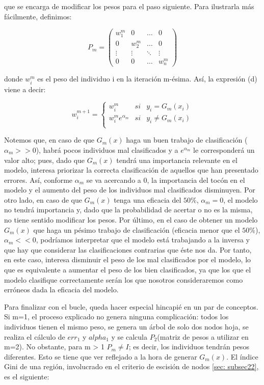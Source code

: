 \documentclass[12pt,twoside]{article}
\begin{document}
\noindent
que se encarga de modificar los pesos para el paso siguiente. Para ilustrarla más fácilmente, definimos:

\begin{equation*}
P_m = 
\begin{pmatrix}
w_1^m & 0 & \dots & 0 \\
0 & w_2^m & \dots & 0 \\
\vdots & \vdots & \ddots & \vdots \\
0 & 0 & \dots & w_n^m
\end{pmatrix}
\end{equation*}

\noindent
donde $w_i^m$ es el peso del individuo i en la iteración m-ésima. Así, la expresión (d) viene a decir:

\begin{equation*}
w_i^{m+1} =
\left\{
\begin{array}{crl}
w_i^m & si & y_i = G_m(x_i) \\
w_i^m e^{\alpha_m} & si & y_i \neq G_m(x_i) \\
\end{array}
\right.
\end{equation*}

Notemos que, en caso de que $G_m(x)$ haga un buen trabajo de clasificación ($\alpha_m >> 0$), habrá pocos individuos mal clasificados y a $e^{\alpha_m}$ le corresponderá un valor alto; pues, dado que $G_m(x)$ tendrá una importancia relevante en el modelo, interesa priorizar la correcta clasificación de aquellos que han presentado errores. Así, conforme $\alpha_m$ se va acercando a 0, la importancia del tocón en el modelo y el aumento del peso de los individuos mal clasificados disminuyen. Por otro lado, en caso de que $G_m(x)$ tenga una eficacia del $50\%$, $\alpha_m = 0$, el modelo no tendrá importancia y, dado que la probabilidad de acertar o no es la misma, no tiene sentido modificar los pesos. Por último, en el caso de obtener un modelo $G_m(x)$ que haga un pésimo trabajo de clasificación (eficacia menor que el $50\%$), $\alpha_m << 0$, podríamos interpretar que el modelo está trabajando a la inversa y que hay que considerar las clasificaciones contrarias que éste nos da. Por tanto, en este caso, interesa disminuir el peso de los mal clasificados por el modelo, lo que es equivalente a aumentar el peso de los bien clasificados, ya que los que el modelo clasifique correctamente serán los que nosotros consideraremos como erróneos dada la eficacia del modelo.

Para finalizar con el bucle, queda hacer especial hincapié en un par de conceptos. Si m=1, el proceso explicado no genera ninguna complicación: todos los individuos tienen el mismo peso, se genera un árbol de solo dos nodos hoja, se realiza el cálculo de $err_1$ y $alpha_1$ y se calcula $P_2$(matriz de pesos a utilizar en m=2). No obstante, para m > 1 $P_m \neq I$; es decir, los individuos tendrán pesos diferentes. Esto se tiene que ver reflejado a la hora de generar $G_m(x)$. El índice Gini de una región, involucrado en el criterio de escisión de nodos \ref{sec: subsec22}, es el siguiente:
\end{document}
